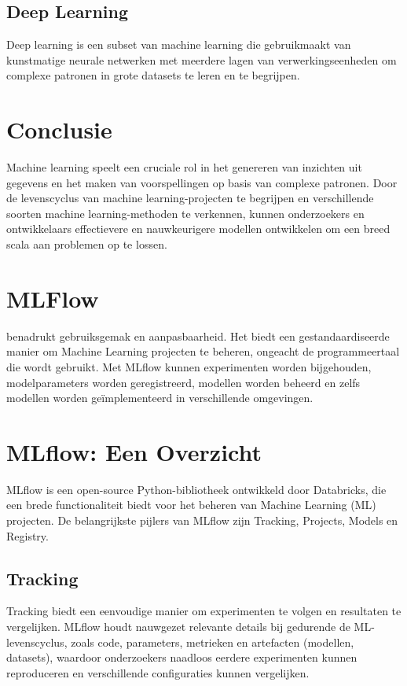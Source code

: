 \subsection{Deep Learning}
Deep learning is een subset van machine learning die gebruikmaakt van kunstmatige neurale netwerken met meerdere lagen van verwerkingseenheden om complexe patronen in grote datasets te leren en te begrijpen.

\section{Conclusie}

Machine learning speelt een cruciale rol in het genereren van inzichten uit gegevens en het maken van voorspellingen op basis van complexe patronen. Door de levenscyclus van machine learning-projecten te begrijpen en verschillende soorten machine learning-methoden te verkennen, kunnen onderzoekers en ontwikkelaars effectievere en nauwkeurigere modellen ontwikkelen om een breed scala aan problemen op te lossen.

\section{MLFlow}

\textcite{MLflow2023} benadrukt gebruiksgemak en aanpasbaarheid. Het biedt een gestandaardiseerde manier om Machine Learning projecten te beheren, ongeacht de programmeertaal die wordt gebruikt. Met MLflow kunnen experimenten worden bijgehouden, modelparameters worden geregistreerd, modellen worden beheerd en zelfs modellen worden geïmplementeerd in verschillende omgevingen.

\section{MLflow: Een Overzicht}

MLflow is een open-source Python-bibliotheek ontwikkeld door Databricks, die een brede functionaliteit biedt voor het beheren van Machine Learning (ML) projecten. De belangrijkste pijlers van MLflow zijn Tracking, Projects, Models en Registry.

\subsection{Tracking}
Tracking biedt een eenvoudige manier om experimenten te volgen en resultaten te vergelijken. MLflow houdt nauwgezet relevante details bij gedurende de ML-levenscyclus, zoals code, parameters, metrieken en artefacten (modellen, datasets), waardoor onderzoekers naadloos eerdere experimenten kunnen reproduceren en verschillende configuraties kunnen vergelijken.

